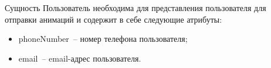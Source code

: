 Сущность Пользователь необходима для представления пользователя для отправки анимаций и содержит в себе следующие атрибуты:
\begin{itemize}
	\item phoneNumber~-- номер телефона пользователя;
	\item email~-- email-адрес пользователя.
\end{itemize}